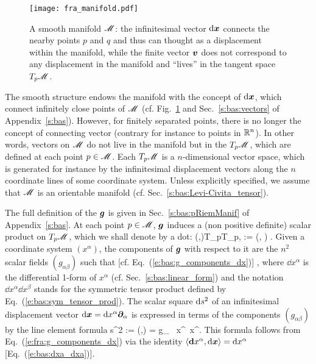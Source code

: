 \begin{figure}
\centerline{\texttt{[image: fra\_manifold.pdf]}}
\caption[]{\label{f:fra:manifold} \footnotesize
A smooth manifold $\mathscr{M}$: the infinitesimal vector $\mathrm{d}\bm{x}$ connects the nearby points $p$ and $q$ and thus
can thought as a displacement within the manifold, while the finite vector $\bm{v}$ does not correspond to
any displacement in the manifold and ``lives'' in the tangent space $T_p\mathscr{M}$.}
\end{figure}


The smooth structure endows the manifold
with the concept of  $\mathrm{d}\bm{x}$, which connect infinitely
close points of $\mathscr{M}$ (cf. Fig.~\ref{f:fra:manifold} and Sec.~\ref{s:bas:vectors} of Appendix~\ref{s:bas}). However, for finitely separated points, there is no
longer the concept of connecting vector (contrary for instance to points in $\mathbb{R}^n$).
In other words, vectors on $\mathscr{M}$ do not live in the manifold but in the
 $T_p\mathscr{M}$, which are defined at each point $p\in\mathscr{M}$. Each  $T_p\mathscr{M}$
is a $n$-dimensional vector space, which is generated for instance by the infinitesimal displacement
vectors along the $n$ coordinate lines of some coordinate system.
Unless explicitly specified, we assume that $\mathscr{M}$ is an orientable manifold (cf. Sec.~\ref{s:bas:Levi-Civita_tensor}).

The full definition of the  $\bm{g}$ is given in Sec.~\ref{s:bas:pRiemManif} of
Appendix~\ref{s:bas}. At each point $p\in\mathscr{M}$, $\bm{g}$ induces a (non positive definite)
scalar product on $T_p\mathscr{M}$, which we shall denote by a dot:
\be
    \forall (,)\in T_p\M\times T_p\M, \quad
        \cdot{} := (, ) .
\ee
Given a coordinate system $(x^\alpha)$, the components of $\bm{g}$ with respect
to it are the $n^2$ scalar fields $(g_{\alpha\beta})$ such that [cf. Eq.~(\ref{e:bas:g_components_dx})]
\be \label{e:fra:g_components_dx}
    ,
\ee
where $\dd x^\alpha$ is the differential 1-form of $x^\alpha$ (cf. Sec.~\ref{s:bas:linear_form})
and the notation $\dd x^\alpha \dd x^\beta$ stands for the symmetric tensor product
defined by Eq.~(\ref{e:bas:sym_tensor_prod}).
The scalar square $\mathrm{d} s^2$ of an infinitesimal
displacement vector $\mathrm{d}\bm{x} = \mathrm{d} x^\alpha \bm{\partial}_\alpha$ is expressed in
terms of the components $(g_{\alpha\beta})$ by the line element
formula
\be \label{e:fra:line_element}
    \D s^2 := (\D{},\D{}) = g_{\alpha\beta} \, \D x^\alpha \, \D x^\beta .
\ee
This formula follows from Eq.~(\ref{e:fra:g_components_dx}) via the identity
$\langle\mathbf{d} x^\alpha,\mathrm{d}\bm{x} \rangle =  \mathrm{d} x^\alpha$ [Eq.~(\ref{e:bas:dxa_dxa})].

